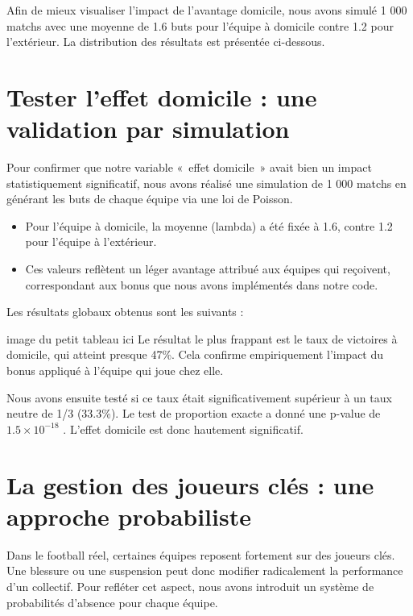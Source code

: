 \documentclass[12pt]{report}
\begin{document}
Afin de mieux visualiser l’impact de l’avantage domicile, nous avons simulé 1 000 matchs avec une moyenne de 1.6 buts pour l’équipe à domicile contre 1.2 pour l’extérieur. La distribution des résultats est présentée ci-dessous.

\section{Tester l'effet domicile : une validation par simulation}

Pour confirmer que notre variable « effet domicile » avait bien un impact statistiquement significatif, nous avons réalisé une simulation de 1 000 matchs en générant les buts de chaque équipe via une loi de Poisson.\\
\begin{itemize}
  \item Pour l’équipe à domicile, la moyenne (lambda) a été fixée à 1.6, contre 1.2 pour l’équipe à l’extérieur.
  \item Ces valeurs reflètent un léger avantage attribué aux équipes qui reçoivent, correspondant aux bonus que nous avons implémentés dans notre code.\\
\end{itemize}





Les résultats globaux obtenus sont les suivants :

image du petit tableau ici
Le résultat le plus frappant est le taux de victoires à domicile, qui atteint presque 47\%. Cela confirme empiriquement l’impact du bonus appliqué à l’équipe qui joue chez elle.

Nous avons ensuite testé si ce taux était significativement supérieur à un taux neutre de 1/3 (33.3\%). Le test de proportion exacte a donné une p-value de $1.5 \times 10^{-18}$
. L'effet domicile est donc hautement significatif.

\section{La gestion des joueurs clés : une approche probabiliste}

Dans le football réel, certaines équipes reposent fortement sur des joueurs clés. Une blessure ou une suspension peut donc modifier radicalement la performance d’un collectif. Pour refléter cet aspect, nous avons introduit un système de probabilités d’absence pour chaque équipe.
\end{document}
